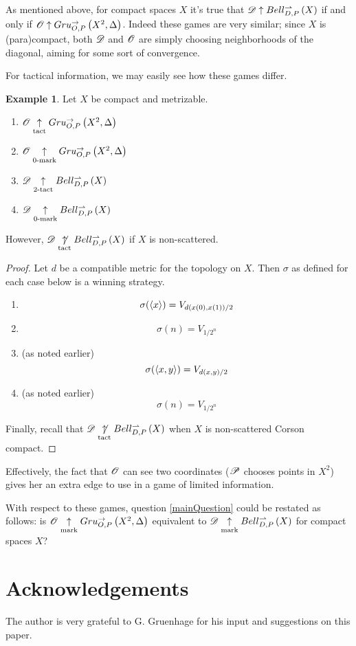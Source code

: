 \documentclass{amsart}
\theoremstyle{definition}
\newtheorem{example}[theorem]{Example}
\begin{document}
  As mentioned above, for compact spaces \(X\) it's true that
  \(\mathscr{D}\uparrow Bell_{D,P}^{\rightharpoonup}\left({X}\right)\) if and only if
  \(\mathscr{O}\uparrow Gru_{O,P}^{\to}\left({X^2},{\Delta}\right)\). Indeed these games are very similar;
  since \(X\) is (para)compact, both \(\mathscr{D}\) and \(\mathscr{O}\) are simply
  choosing neighborhoods of the diagonal, aiming for some sort of convergence.

  For tactical information, we may easily see how
  these games differ.

  \begin{example}
    Let \(X\) be compact and metrizable.
      \begin{enumerate}
        \item
          \(\mathscr{O}\underset{\text{tact}}{\uparrow}Gru_{O,P}^{\to}\left({X^2},{\Delta}\right)\)
        \item
          \(\mathscr{O}\underset{0\text{-mark}}{\uparrow}Gru_{O,P}^{\to}\left({X^2},{\Delta}\right)\)
        \item
          \(\mathscr{D}\underset{2\text{-tact}}{\uparrow}Bell_{D,P}^{\rightharpoonup}\left({X}\right)\)
        \item
          \(\mathscr{D}\underset{0\text{-mark}}{\uparrow}Bell_{D,P}^{\rightharpoonup}\left({X}\right)\)
      \end{enumerate}
    However, \(\mathscr{D}\underset{\text{tact}}{\not\uparrow}Bell_{D,P}^{\rightharpoonup}\left({X}\right)\) if \(X\) is non-scattered.
  \end{example}

  \begin{proof}
    Let \(d\) be a compatible metric for the topology on \(X\).
    Then \(\sigma\) as defined for each case below is a winning strategy.
    \begin{enumerate}
      \item
        \[
          \sigma(\langle x\rangle)
            =
          V_{d(x(0),x(1))/2}
        \]
      \item
        \[
          \sigma(n)
            =
          V_{1/2^n}
        \]
      \item (as noted earlier)
        \[
          \sigma(\langle x,y\rangle)
            =
          V_{d(x,y)/2}
        \]
      \item (as noted earlier)
        \[
          \sigma(n)
            =
          V_{1/2^n}
        \]
    \end{enumerate}
    Finally, recall that \(\mathscr{D}\underset{\text{tact}}{\not\uparrow}Bell_{D,P}^{\rightharpoonup}\left({X}\right)\)
    when \(X\) is non-scattered Corson compact.
  \end{proof}

  Effectively, the fact that \(\mathscr{O}\) can see two coordinates (\(\mathscr{P}\)
  chooses points in \(X^2\)) gives her an extra edge to use in a game
  of limited information.

  With respect to these games,
  question \ref{mainQuestion} could be restated as follows:
  is \(\mathscr{O}\underset{\text{mark}}{\uparrow}Gru_{O,P}^{\to}\left({X^2},{\Delta}\right)\) equivalent to
  \(\mathscr{D}\underset{\text{mark}}{\uparrow}Bell_{D,P}^{\rightharpoonup}\left({X}\right)\) for compact spaces \(X\)?

\section{Acknowledgements}

  The author is very grateful to G. Gruenhage for his input and
  suggestions on this paper.




\end{document}
